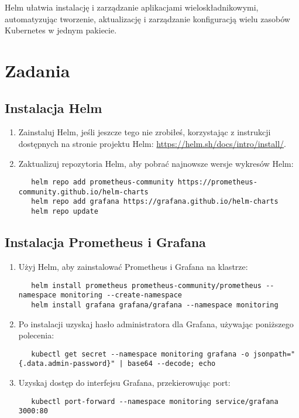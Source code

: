 \documentclass{article}
\begin{document}
Helm ułatwia instalację i zarządzanie aplikacjami wieloskładnikowymi, automatyzując tworzenie, aktualizację i zarządzanie konfiguracją wielu zasobów Kubernetes w jednym pakiecie.

\section{Zadania}

\subsection{Instalacja Helm}
\begin{enumerate}
  \item Zainstaluj Helm, jeśli jeszcze tego nie zrobiłeś, korzystając z instrukcji dostępnych na stronie projektu Helm: \url{https://helm.sh/docs/intro/install/}.
  \item Zaktualizuj repozytoria Helm, aby pobrać najnowsze wersje wykresów Helm:
   \begin{lstlisting}
   helm repo add prometheus-community https://prometheus-community.github.io/helm-charts
   helm repo add grafana https://grafana.github.io/helm-charts
   helm repo update
   \end{lstlisting}
\end{enumerate}
\subsection{Instalacja Prometheus i Grafana}
\begin{enumerate}
  \item Użyj Helm, aby zainstalować Prometheus i Grafana na klastrze:
   \begin{lstlisting}
   helm install prometheus prometheus-community/prometheus --namespace monitoring --create-namespace
   helm install grafana grafana/grafana --namespace monitoring
   \end{lstlisting}
 \item Po instalacji uzyskaj hasło administratora dla Grafana, używając poniższego polecenia:
   \begin{lstlisting}
   kubectl get secret --namespace monitoring grafana -o jsonpath="{.data.admin-password}" | base64 --decode; echo
   \end{lstlisting}
 \item Uzyskaj dostęp do interfejsu Grafana, przekierowując port:
   \begin{lstlisting}
   kubectl port-forward --namespace monitoring service/grafana 3000:80
   \end{lstlisting}
\end{enumerate}
\end{document}
